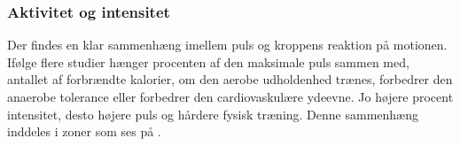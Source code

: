 \subsubsection{Aktivitet og intensitet}
Der findes en klar sammenhæng imellem puls og kroppens reaktion på motionen. Ifølge flere studier hænger procenten af den maksimale puls sammen med, antallet af forbrændte kalorier, om den aerobe udholdenhed trænes, forbedrer den anaerobe tolerance eller forbedrer den cardiovaskulære ydeevne. Jo højere procent intensitet, desto højere puls og hårdere fysisk træning. Denne sammenhæng inddeles i zoner som ses på . \citep{Leyland2007,Heartratejournal2015}

